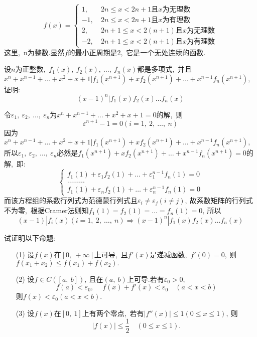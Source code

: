 	\begin{solution}
		$$
		f(x) = \begin{cases}
			1,\  & 2n\le x < 2n+1 \text{且} x\text{为无理数} \\
			-1,\  &  2n\le x < 2n+1 \text{且} x\text{为有理数}	\\
			2,\  & 2n+1\le x < 2(n+1) \text{且} x\text{为无理数} \\
			-2,\  & 2n+1\le x < 2(n+1) \text{且} x\text{为有理数}
		\end{cases}
		$$
		这里,\ n为整数.显然$f$的最小正周期是2,\ 它是一个无处连续的函数. 
	\end{solution}
	
	\newpage
	\begin{problem}
		设$n$为正整数,\ $f_1(x),\ f_2(x),\ \dots,\ f_n(x)$都是多项式,\ 并且$x^n+x^{n-1}+\dots+x^2+x+1|f_1(x^{n+1})+xf_2(x^{n+1})+\dots+x^{n-1}f_n(x^{n+1}),\ $证明:
		$$(x-1)^n|f_1(x)f_2(x)\dots f_n(x)$$
	\end{problem}
	
	\begin{solution}
		令$\varepsilon_1,\ \varepsilon_2,\ \dots,\ \varepsilon_n$为$x^n+x^{n-1}+\dots+x^2+x+1=0$的解,\ 则
		$$\varepsilon^{n+1}-1=0(i=1,\ 2,\ \dots,\ n)$$
		因为$x^n+x^{n-1}+\dots+x^2+x+1|f_1(x^{n+1})+xf_2(x^{n+1})+\dots+x^{n-1}f_n(x^{n+1}),\ $所以$\varepsilon_1,\ \varepsilon_2,\ \dots,\ \varepsilon_n$必然是$f_1(x^{n+1})+xf_2(x^{n+1})+\dots+x^{n-1}f_n(x^{n+1})=0$的解,\ 即:
		$$\left\{\begin{matrix} 
			f_1(1)+\varepsilon_1f_2(1)+\dots+\varepsilon_1^{n-1}f_n(1)=0 \\
			\dots\dots\dots \\  
			f_1(1)+\varepsilon_nf_2(1)+\dots+\varepsilon_n^{n-1}f_n(1)=0 
		\end{matrix}\right. $$
		而该方程组的系数行列式为范德蒙行列式且$\varepsilon_i\neq\varepsilon_j(i\neq j),\ $故系数矩阵的行列式不为零,\ 根据Cramer法则知$f_1(1)=f_2(1)=\dots=f_n(1)=0,\ $所以
		$$(x-1)|f_i(x)(i=1,\ 2,\ \dots,\ n)\Rightarrow(x-1)^{n}|f_1(x)f_2(x)\dots f_n(x)$$ 
	\end{solution}
	\newpage
	\begin{problem}
		试证明以下命题:
		\begin{itemize}
			\item[(1)]设$f(x)$在$[0,\ +\infty]$上可导,\ 且$f'(x)$是递减函数,\ $f'(0)=0,\ $则$f(x_1+x_2)\le f(x_1) + f(x_2).$
			\item [(2)]设$f\in C([a,\ b]),\ $且在$(a,\ b)$上可导.若有$\varepsilon_0>0,\ $
			$$f(a) < \varepsilon_0,\ \quad f(x) + f'(x)<\varepsilon_0\quad (a<x<b)$$
			则$f(x)<\varepsilon_0(a<x<b).$
			\item[(3)] 设$f(x)$在$[0,\ 1]$上有两个零点,\ 若有$|f''(x)|\le 1(0\le x \le 1),\ $则
			$$|f(x)|\le \frac{1}{2} \quad (0\le x \le 1).$$
		\end{itemize}
	\end{problem}
	
